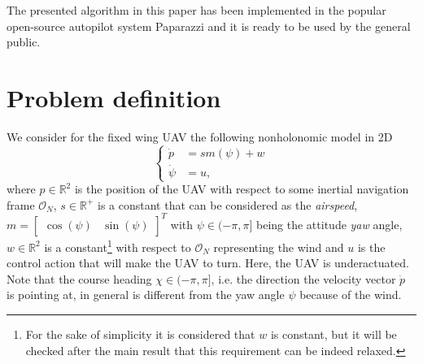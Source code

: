 \documentclass[letterpaper, 10 pt, conference]{ieeeconf}  %
\begin{document}
The presented algorithm in this paper has been implemented in the popular open-source autopilot system Paparazzi \cite{papa} and it is ready to be used by the general public. %

\section{Problem definition}
\label{sec: prob}
We consider for the fixed wing UAV the following nonholonomic model in 2D
\begin{equation}
\begin{cases}
	\dot p &= sm(\psi) + w \\
	\dot\psi &= u,
\end{cases}
	\label{eq: pdyn}
\end{equation}
where $p\in\mathbb{R}^2$ is the position of the UAV with respect to some inertial navigation frame $\mathcal{O}_N$, $s\in\mathbb{R}^+$ is a constant that can be considered as the \emph{airspeed}, $m = \begin{bmatrix}\cos(\psi) & \sin(\psi)\end{bmatrix}^T$ with $\psi\in(-\pi, \pi]$ being the attitude \emph{yaw} angle, $w\in\mathbb{R}^2$ is a constant\footnote{For the sake of simplicity it is considered that $w$ is constant, but it will be checked after the main result that this requirement can be indeed relaxed.} with respect to $\mathcal{O}_N$ representing the wind and $u$ is the control action that will make the UAV to turn. Here, the UAV is underactuated. Note that the course heading $\chi\in(-\pi, \pi]$, i.e. the direction the velocity vector $\dot p$ is pointing at, in general is different from the yaw angle $\psi$ because of the wind.
\end{document}
